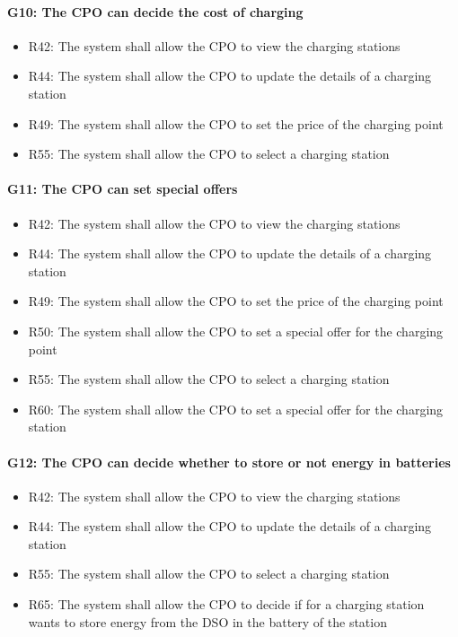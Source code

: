 \paragraph{G10: The CPO can decide the cost of charging}
\begin{itemize}
    \item R42: The system shall allow the CPO to view the charging stations
    \item R44: The system shall allow the CPO to update the details of a charging station
    \item R49: The system shall allow the CPO to set the price of the charging point
    \item R55: The system shall allow the CPO to select a charging station
\end{itemize}

\paragraph{G11: The CPO can set special offers}
\begin{itemize}
    \item R42: The system shall allow the CPO to view the charging stations
    \item R44: The system shall allow the CPO to update the details of a charging station
    \item R49: The system shall allow the CPO to set the price of the charging point
    \item R50: The system shall allow the CPO to set a special offer for the charging point
    \item R55: The system shall allow the CPO to select a charging station
    \item R60: The system shall allow the CPO to set a special offer for the charging station
\end{itemize}

\paragraph{G12: The CPO can decide whether to store or not energy in batteries}
\begin{itemize}
    \item R42: The system shall allow the CPO to view the charging stations
    \item R44: The system shall allow the CPO to update the details of a charging station
    \item R55: The system shall allow the CPO to select a charging station
    \item R65: The system shall allow the CPO to decide if for a charging station wants to store energy from the DSO in the battery of the station
\end{itemize}
